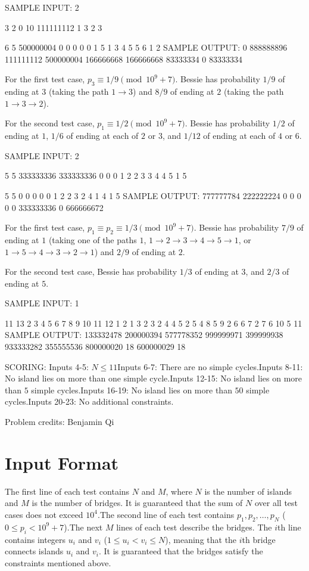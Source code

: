\documentclass[12pt]{article}
\begin{document}
SAMPLE INPUT:
2

3 2
0 10 111111112
1 3
2 3

6 5
500000004 0 0 0 0 0
1 5
1 3
4 5
5 6
1 2
SAMPLE OUTPUT: 
0 888888896 111111112
500000004 166666668 166666668 83333334 0 83333334

For the first test case, $p_3\equiv 1/9 \pmod{10^9+7}$. Bessie has  probability
$1/9$ of ending at $3$ (taking the path $1\to 3$) and $8/9$  of ending at $2$
(taking the path $1\to 3\to 2$).

For the second test case, $p_1\equiv 1/2\pmod{10^9+7}$. Bessie has probability 
$1/2$ of ending at $1$,  $1/6$ of ending at each of $2$ or $3$, and $1/12$  of
ending at each of $4$ or $6$.

SAMPLE INPUT:
2

5 5
333333336 333333336 0 0 0
1 2
2 3
3 4
4 5
1 5

5 5
0 0 0 0 0
1 2
2 3
2 4
1 4
1 5
SAMPLE OUTPUT: 
777777784 222222224 0 0 0
0 0 333333336 0 666666672

For the first test case, $p_1\equiv p_2\equiv 1/3\pmod{10^9+7}$.  Bessie has
probability $7/9$ of ending at $1$ (taking one of the paths $1$,
$1\to 2\to 3\to 4\to 5\to 1$, or $1\to 5\to 4\to 3\to 2\to 1$) and $2/9$ of
ending at $2$.

For the second test case, Bessie has probability $1/3$ of ending at $3$, and
$2/3$ of ending at $5$.

SAMPLE INPUT:
1

11 13
2 3 4 5 6 7 8 9 10 11 12
1 2
1 3
2 3
2 4
4 5
2 5
4 8
5 9
2 6
6 7
2 7
6 10
5 11
SAMPLE OUTPUT: 
133332478 200000394 577778352 999999971 399999938 933333282 355555536 800000020 18 600000029 18

SCORING:
Inputs 4-5: $N\le 11$Inputs 6-7: There are no simple cycles.Inputs 8-11: No island lies on more than one simple cycle.Inputs 12-15: No island lies on more than $5$ simple cycles.Inputs 16-19: No island lies on more than $50$ simple cycles.Inputs 20-23: No additional constraints.


Problem credits: Benjamin Qi



\section*{Input Format}
The first line of each test contains $N$ and $M$, where $N$ is the number of
islands and $M$ is the number of bridges. It is guaranteed that the sum of $N$
over all test cases does not exceed $10^4$.The second line of each test contains $p_1, p_2,\dots, p_N$ ($0\le p_i<10^9+7$).The next $M$ lines of each test describe the bridges. The $i$th line contains
integers $u_i$ and $v_i$ ($1\le u_i<v_i\le N$), meaning that the $i$th  bridge
connects islands $u_i$ and $v_i$. It is guaranteed that the bridges satisfy the
constraints mentioned above.
\end{document}
